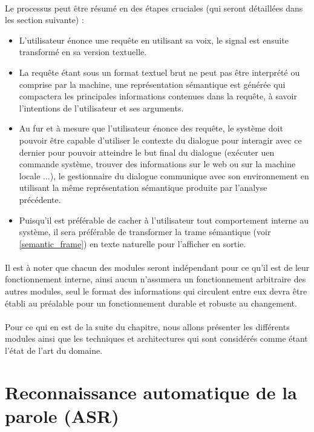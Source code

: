 	\paragraph{}
	Le processus peut être résumé en des étapes cruciales (qui seront détaillées dans les section suivante) : 
	\begin{itemize}
		\label{spa_life_cycle}
		\item L'utilisateur énonce une requête en utilisant sa voix, le signal est ensuite transformé en sa version textuelle.
		\item La requête étant sous un format textuel brut ne peut pas être interprété ou comprise par la machine, une représentation sémantique est générée qui compactera les principales informations contenues dans la requête, à savoir l'intentions de l'utilisateur et ses arguments.
		\item Au fur et à mesure que l'utilisateur énonce des requête, le système doit pouvoir être capable d'utiliser le contexte du dialogue pour interagir avec ce dernier pour pouvoir atteindre le but final du dialogue (exécuter uen commande système, trouver des informations sur le web ou sur la machine locale ...), le gestionnaire du dialogue communique avec son environnement en utilisant la même représentation sémantique produite par l'analyse précédente.
		\item Puisqu'il est préférable de cacher à l'utilisateur tout comportement interne au système, il sera préférable de transformer la trame sémantique (voir \ref{semantic_frame}) en texte naturelle pour l'afficher en sortie.
	\end{itemize}
	\paragraph{}
	Il est à noter que chacun des modules seront indépendant pour ce qu'il est de leur fonctionnement interne, ainsi aucun n'assumera un fonctionnement arbitraire des autres modules, seul le format des informations qui circulent entre eux devra être établi au préalable pour un fonctionnement durable et robuste au changement.
	\paragraph{}
	Pour ce qui en est de la suite du chapitre, nous allons présenter les différents modules ainsi que les techniques et architectures qui sont considérés comme étant l'état de l'art du domaine. 
\section{Reconnaissance automatique de la parole (ASR)}
